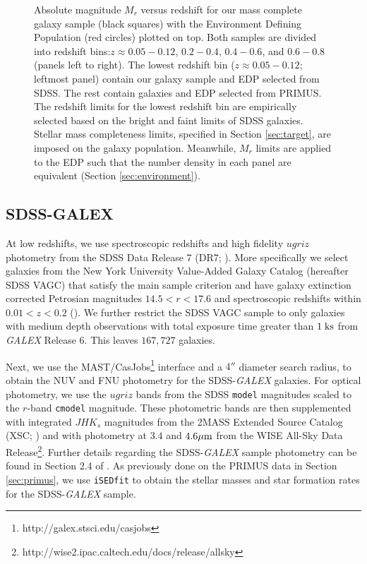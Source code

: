 \documentclass{emulateapj}
\begin{document}
\begin{figure*}
    \begin{center}
        \leavevmode
        \caption{Absolute magnitude $M_{r}$ versus redshift for our mass complete galaxy sample (black squares) with the Environment Defining Population (red circles) plotted on top. Both samples are divided into redshift bins:$z \approx 0.05-0.12$, $0.2-0.4$, $0.4-0.6$, and $0.6-0.8$ (panels left to right). The lowest redshift bin ($z \approx 0.05-0.12$; leftmost panel) contain our galaxy sample and EDP selected from SDSS. The rest contain galaxies and EDP selected from PRIMUS. The redshift limits for the lowest redshift bin are empirically selected based on the bright and faint limits of SDSS galaxies. Stellar mass completeness limits, specified in Section \ref{sec:target}, are imposed on the galaxy population. Meanwhile, $M_{r}$ limits are applied to the EDP such that the number density in each panel are equivalent (Section \ref{sec:environment}).} \label{fig:targetEDP}
    \end{center}
\end{figure*}
\subsection{SDSS-GALEX} \label{sec:sdss}
At low redshifts, we use spectroscopic redshifts and high fidelity $ugriz$ photometry from the SDSS Data Release 7 (DR7; \cite{Abazajian:2009aa}). More specifically we select galaxies from the New York University Value-Added Galaxy Catalog (hereafter SDSS VAGC) that satisfy the main sample criterion and have galaxy extinction corrected Petrosian magnitudes $14.5 < r < 17.6$ and spectroscopic redshifts within $0.01 < z < 0.2$ (\cite{Blanton:2005aa}). We further restrict the SDSS VAGC sample to only galaxies with medium depth observations with total exposure time greater than $1 \; \rm{ks}$ from {\em GALEX} Release 6. This leaves $167,727$ galaxies. 

Next, we use the MAST/CasJobs\footnote{http://galex.stsci.edu/casjobs} interface and a $4''$ diameter search radius, to obtain the NUV and FNU photometry for the SDSS-{\em GALEX} galaxies. For optical photometry, we use the $ugriz$ bands from the SDSS \texttt{model} magnitudes scaled to the $r$-band \texttt{cmodel} magnitude. These photometric bands are then supplemented with integrated $JHK_s$ magnitudes from the 2MASS Extended Source Catalog (XSC; \cite{Jarrett:2000aa}) and with photometry at $3.4$ and $4.6 \mu \rm{m}$ from the WISE All-Sky Data Release\footnote{http://wise2.ipac.caltech.edu/docs/release/allsky}. Further details regarding the SDSS-{\em GALEX} sample photometry can be found in Section 2.4 of \cite{Moustakas:2013aa}. As previously done on the PRIMUS data in Section \ref{sec:primus}, we use \texttt{iSEDfit} to obtain the stellar masses and star formation rates for the SDSS-{\em GALEX} sample. 
\end{document}
